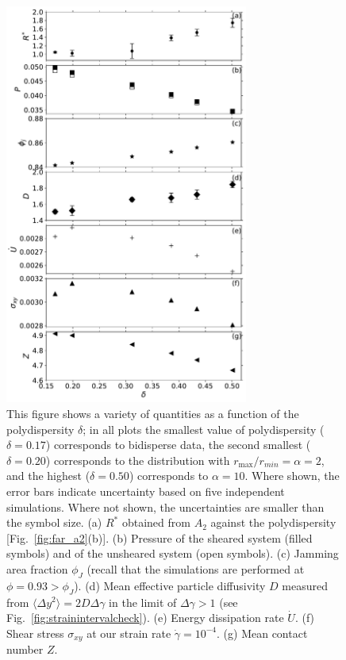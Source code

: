 \documentclass[%
 reprint,
 amsmath,amssymb,
 aps,
]{revtex4-2}
\begin{document}
\begin{figure}
    \centering
    \includegraphics[width=8cm]{quantities_delta101123.pdf}
    \caption{This figure shows a variety of quantities as a function of the polydispersity $\delta$; in all plots the smallest value of polydispersity ($\delta=0.17$) corresponds to bidisperse data, the second smallest ($\delta=0.20$) corresponds to the distribution with $r_{\max}/r_{min} = \alpha = 2$, and the highest ($\delta = 0.50$) corresponds to $\alpha=10$.  Where shown, the error bars indicate uncertainty based on five independent simulations.  Where not shown, the uncertainties are smaller than the symbol size. 
    (a) $R^{\ast}$ obtained from $A_2$ against the polydispersity [Fig.~\ref{fig:far_a2}(b)].  (b) Pressure of the sheared system (filled symbols) and of the unsheared system (open symbols).  (c) Jamming area fraction $\phi_J$ (recall that the simulations are performed at $\phi = 0.93 > \phi_J$).  (d) Mean effective particle diffusivity $D$ measured from $\langle \Delta y^2 \rangle = 2 D \Delta \gamma$ in the limit of $\Delta \gamma > 1$ (see Fig.~\ref{fig:strainintervalcheck}). (e) Energy dissipation rate $\dot{U}$.  (f) Shear stress $\sigma_{xy}$ at our strain rate $\dot{\gamma} = 10^{-4}$.  (g) Mean contact number $Z$.}
    \label{fig:delta}
    \vspace*{-10pt}
\end{figure}
\end{document}
